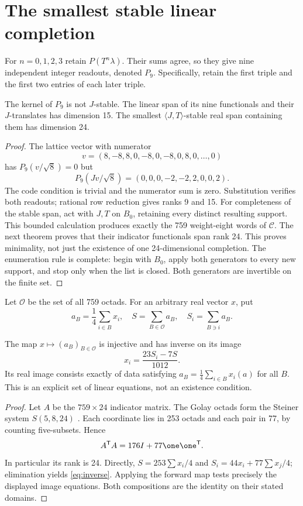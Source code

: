 \section{The smallest stable linear completion}
For $n=0,1,2,3$ retain $P(T^n\lambda)$. Their sums agree, so they give nine independent integer readouts, denoted $P_9$. Specifically, retain the first triple and the first two entries of each later triple.
\begin{proposition}\label{prop:ninefailure}
The kernel of $P_9$ is not $J$-stable. The linear span of its nine functionals and their $J$-translates has dimension 15. The smallest $\langle J,T\rangle$-stable real span containing them has dimension 24.
\end{proposition}
\begin{proof}
The lattice vector with numerator
\[
v=(8,-8,8,0,-8,0,-8,0,8,0,\ldots,0)
\]
has $P_9(v/\sqrt8)=0$ but
\[
P_9(Jv/\sqrt8)=(0,0,0,-2,-2,2,0,0,2).
\]
The code condition is trivial and the numerator sum is zero. Substitution verifies both readouts; rational row reduction gives ranks 9 and 15. For completeness of the stable span, act with $J,T$ on $B_0$, retaining every distinct resulting support. This bounded calculation produces exactly the 759 weight-eight words of $\mathcal C$. The next theorem proves that their indicator functionals span rank 24. This proves minimality, not just the existence of one 24-dimensional completion. The enumeration rule is complete: begin with $B_0$, apply both generators to every new support, and stop only when the list is closed. Both generators are invertible on the finite set.
\end{proof}

Let $\mathcal O$ be the set of all 759 octads. For an arbitrary real vector $x$, put
\[
 a_B=\frac14\sum_{i\in B}x_i,\quad
 S=\sum_{B\in\mathcal O}a_B,\quad
 S_i=\sum_{B\ni i}a_B.
\]
\begin{theorem}\label{thm:reconstruction}
The map $x\mapsto(a_B)_{B\in\mathcal O}$ is injective and has inverse on its image
\begin{equation}\label{eq:inverse}
\boxed{x_i=\frac{23S_i-7S}{1012}.}
\end{equation}
Its real image consists exactly of data satisfying
$a_B=\frac14\sum_{i\in B}x_i(a)$ for all $B$. This is an explicit set of linear equations, not an existence condition.
\end{theorem}
\begin{proof}
Let $A$ be the $759\times24$ indicator matrix. The Golay octads form the Steiner system $S(5,8,24)$ \cite[Theorem 1]{chapman}. Each coordinate lies in 253 octads and each pair in 77, by counting five-subsets. Hence
\[
A^{\mathsf T}A=176I+77\one\one^{\mathsf T}.
\]
In particular its rank is 24. Directly,
$S=253\sum x_i/4$ and $S_i=44x_i+77\sum x_j/4$; elimination yields \eqref{eq:inverse}. Applying the forward map tests precisely the displayed image equations. Both compositions are the identity on their stated domains.
\end{proof}

